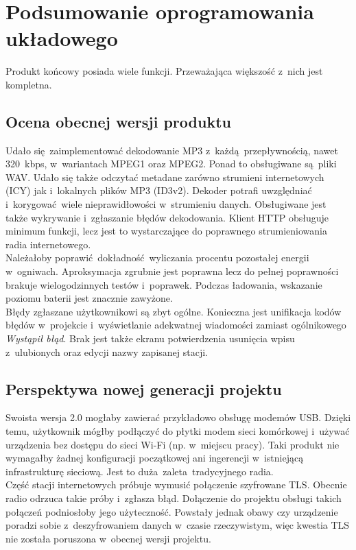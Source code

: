 \documentclass[polish]{aghengthesis}
\begin{document}
	\section{Podsumowanie oprogramowania układowego}
		Produkt końcowy posiada wiele funkcji. Przeważająca większość z~nich jest kompletna.
		
		\subsection{Ocena obecnej wersji produktu}
			Udało się zaimplementować dekodowanie MP3 z~każdą przepływnością, nawet 320~kbps, w~wariantach MPEG1 oraz MPEG2. Ponad to obsługiwane są pliki WAV. Udało się także odczytać metadane zarówno strumieni internetowych (ICY) jak i~lokalnych plików MP3 (ID3v2). Dekoder potrafi uwzględniać i~korygować wiele nieprawidłowości w~strumieniu danych. Obsługiwane jest także wykrywanie i~zgłaszanie błędów dekodowania. Klient HTTP obsługuje minimum funkcji, lecz jest to wystarczające do poprawnego strumieniowania radia internetowego.
			$ $\\
			
			Należałoby poprawić dokładność wyliczania procentu pozostałej energii w~ogniwach. Aproksymacja zgrubnie jest poprawna lecz do pełnej poprawności brakuje wielogodzinnych testów i~poprawek. Podczas ładowania, wskazanie poziomu baterii jest znacznie zawyżone.
			$ $\\
			
			Błędy zgłaszane użytkownikowi są zbyt ogólne. Konieczna jest unifikacja kodów błędów w~projekcie i~wyświetlanie adekwatnej wiadomości zamiast ogólnikowego \textit{Wystąpił błąd}. Brak jest także ekranu potwierdzenia usunięcia wpisu z~ulubionych oraz edycji nazwy zapisanej stacji.
		
		\subsection{Perspektywa nowej generacji projektu}
			Swoista wersja 2.0 mogłaby zawierać przykładowo obsługę modemów USB. Dzięki temu, użytkownik mógłby podłączyć do płytki modem sieci komórkowej i~używać urządzenia bez dostępu do sieci Wi-Fi (np. w~miejscu pracy). Taki produkt nie wymagałby żadnej konfiguracji początkowej ani ingerencji w~istniejącą infrastrukturę sieciową. Jest to duża zaleta tradycyjnego radia.
			$ $\\
			
			Część stacji internetowych próbuje wymusić połączenie szyfrowane TLS. Obecnie radio odrzuca takie próby i~zgłasza błąd. Dołączenie do projektu obsługi takich połączeń podniosłoby jego użyteczność. Powstały jednak obawy czy urządzenie poradzi sobie z~deszyfrowaniem danych w~czasie rzeczywistym, więc kwestia TLS nie została poruszona w~obecnej wersji projektu.
			$ $\\
			
\end{document}
